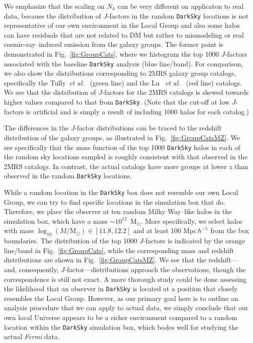 We emphasize that the scaling on $N_h$ can be very different on applicaton to real data, because the distribution of $J$-factors in the random \texttt{DarkSky} locations is not representative of our own environment in the Local Group and also some halos can have residuals that are not related to DM but rather to mismodeling or real cosmic-ray--induced emission from the galaxy groups.  The former point is demonstrated in Fig.~\ref{fig:GroupCats}, where we histogram the top 1000 $J$-factors associated with the baseline \texttt{DarkSky} analysis (blue line/band).  For  comparison, we also show the distributions corresponding to 2MRS  galaxy group catalogs, specifically the Tully~\emph{et al.}~\cite{Tully:2015opa,2017ApJ...843...16K} (green line) and the Lu 
~\emph{et al.}~\cite{Lu:2016vmu} (red line) catalogs.  We see that the distribution of $J$-factors for the 2MRS catalogs is skewed towards higher values compared to that from \texttt{DarkSky}.  (Note that the cut-off at low $J$-factors is artificial and is simply a result of including 1000 halos for each catalog.)

The differences in the $J$-factor distributions can be traced to the redshift distribution of the galaxy groups, as illustrated in Fig.~\ref{fig:GroupCatsMZ}.  We see specifically that the mass function of the top 1000 \texttt{DarkSky} halos in each of the random sky locations sampled is roughly consistent with that observed in the 2MRS catalogs.  In contrast, the actual catalogs have more groups at lower $z$ than observed in the random \texttt{DarkSky} locations.  

While a random location in the \texttt{DarkSky} box does not resemble our own Local Group, we can try to find specific locations in the simulation box that do.  Therefore, we place the observer at ten random Milky Way--like halos in the simulation box, which have a mass $\sim10^{12}$~M$_\odot$.  More specifically, we select halos with mass $\log_{10}(M/\mathrm{M}_\odot) \in [11.8,12.2]$ and at least 100 Mpc\,$h^{-1}$ from the box boundaries.  The distribution of the top 1000 $J$-factors is indicated by the orange line/band in Fig.~\ref{fig:GroupCats}, while the corresponding mass and redshift distributions are shown in Fig.~\ref{fig:GroupCatsMZ}.  We see that the redshift---and, consequently, $J$-factor---distributions approach the observations, though the correspondence is still not exact.  A more thorough study could be done assessing the likelihood that an observer in \texttt{DarkSky} is located at a position that closely resembles the Local Group.  However, as our primary goal here is to outline an analysis procedure that we can apply to actual data, we simply conclude that our own local Universe appears to be a richer environment compared to a random location within the \texttt{DarkSky} simulation box, which bodes well for studying the actual \emph{Fermi} data.

